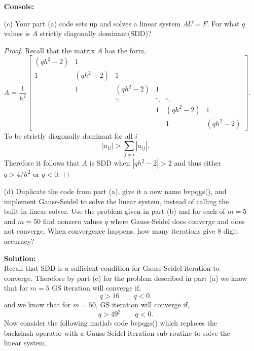 \documentclass[12pt]{article}
\makeatletter
\theoremstyle{homework}
\newenvironment{exercise}[1]
{\def\@currentlabel{#1}\exercisecore}
{\endexercisecore}
\newcommand{\localhead}[1]{\par\smallskip\noindent\textbf{#1}\nobreak\\}%
\newcommand\solution{\localhead{Solution:}}
\makeatother
\begin{document}
\begin{exercise}{Problem P15}
\begin{enumerate}
      \textbf{Console:}
      \begin{center}
        
      \end{center}
    \item[(c)] Your part (a) code sets up and solves a linear system $AU = F$. For what $q$ values is 
    $A$ strictly diagonally dominant(SDD)?
    \begin{proof} Recall that the matrix $A$ has the form, 
      \begin{equation*}
        A = \frac{1}{h^2}
        \begin{bmatrix}
             (qh^2 - 2) &    1    &         &         &         &         \\ 
                   1 & (qh^2 - 2) &    1    &         &         &         \\ 
                     &    1    & (qh^2 - 2) &    1    &         &         \\ 
                     &         &  \ddots &  \ddots & \ddots  &         \\
                     &         &         &    1    & (qh^2 - 2) &   1     \\
                     &         &         &         &    1    & (qh^2 - 2) 
        \end{bmatrix}.
      \end{equation*}
      To be strictly diagonally dominant for all $i$
      \begin{equation*}
        |a_{ii}|>\sum_{j \neq i} |a_{ij}|.
      \end{equation*}
      Therefore it follows that $A$ is SDD when $|qh^2 - 2| > 2$ and thus either $q > 4/h^2$ or $q < 0$.
    \end{proof}

    \item[(d)] Duplicate the code from part (a), give it a new name bvpqgs(), and implement Gauss-Seidel to 
    solve the linear system, instead of calling the built-in linear solver. Use the problem given in part (b)
    and for each of $m = 5$ and $m = 50$ find nonzero values $q$ where Gauss-Seidel does converge and does not converge. 
    When convergence happens, how many iterations give 8 digit accuracy?
    \solution Recall that SDD is a sufficient condition for Gauss-Seidel iteration to converge. Therefore by part (c) for the problem described in 
    part (a) we know that for $m = 5$ GS iteration will converge if, 
    \begin{equation*}
      q > 16 \qquad q < 0.
    \end{equation*}
    and we know that for $m = 50$, GS iteration will converge if, 
    \begin{equation*}
      q > 49^2 \qquad q < 0.
    \end{equation*}
    Now consider the following matlab code bvpqgs() which replaces the backslash operator with a Gauss-Seidel iteration sub-routine to solve the linear system,\\


\end{enumerate}
\end{exercise}
\end{document}
